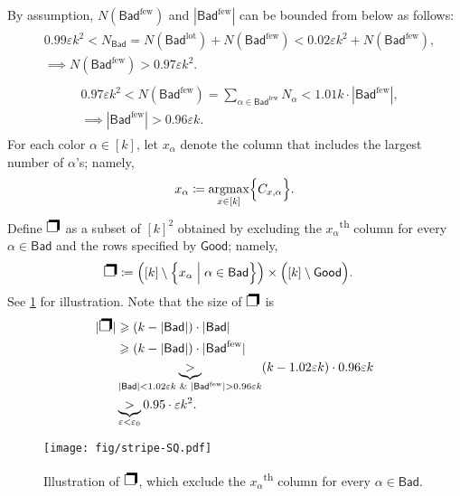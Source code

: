 \documentclass[11pt,fleqn]{article}
\renewcommand{\geq}{\geqslant}
\renewcommand{\epsilon}{\varepsilon}
\newcommand{\nth}[1]{#1\textsuperscript{th}\xspace}
\newcommand{\defeq}{\coloneq}
\DeclareMathOperator*{\argmax}{argmax}
\newcommand{\Good}{\mathsf{Good}}
\newcommand{\Bad}{\mathsf{Bad}}
\newcommand{\Badgtr}{\Bad^\mathrm{lot}}
\newcommand{\Badlss}{\Bad^\mathrm{few}}
\newcommand{\SQ}{\text{{\Large\ding{112}}}}
\theoremstyle{definition}
\numberwithin{equation}{section}
\begin{document}
By assumption,
$N(\Badlss)$ and $|\Badlss|$ can be bounded from below as follows:
\begin{align}
\begin{aligned}
    & 0.99\epsilon k^2
    < N_\Bad
    = N(\Badgtr) + N(\Badlss)
    < 0.02 \epsilon k^2 + N(\Badlss), \\
    & \implies N(\Badlss) > 0.97 \epsilon k^2.
\end{aligned}
\end{align}
\begin{align}
\begin{aligned}
    & 0.97 \epsilon k^2
    < N(\Badlss) = \sum_{\alpha \in \Badlss} N_\alpha
    < 1.01k \cdot |\Badlss|, \\
    & \implies |\Badlss| > 0.96 \epsilon k.
\end{aligned}
\end{align}
For each color $\alpha \in [k]$,
let $x_\alpha$ denote the column that includes the largest number of $\alpha$'s; namely,
\begin{align}
    x_\alpha \defeq \argmax_{x \in [k]} \Bigl\{ C_{x,\alpha} \Bigr\}.
\end{align}
Define $\SQ$ as a subset of $[k]^2$ obtained by excluding
the \nth{$x_\alpha$} column for every $\alpha \in \Bad$ and
the rows specified by $\Good$; namely,
\begin{align}
\begin{aligned}
    \SQ & \defeq
        \Bigl( [k] \setminus \Bigl\{x_\alpha \Bigm| \alpha \in \Bad \Bigr\} \Bigr) \times
        \Bigl( [k] \setminus \Good \Bigr).
\end{aligned}
\end{align}
See \cref{fig:Cut-hard:stripe:far:SQ} for illustration.
Note that the size of $\SQ$ is 
\begin{align}
\begin{aligned}
    |\SQ| & \geq (k-|\Bad|) \cdot |\Bad| \\
    & \geq (k-|\Bad|) \cdot |\Badlss| \\
    & \underbrace{>}_{|\Bad| < 1.02\epsilon k \text{ \& } |\Badlss| > 0.96\epsilon k}
        (k-1.02\epsilon k) \cdot 0.96 \epsilon k \\
    & \underbrace{>}_{\epsilon < \epsilon_0} 0.95 \cdot \epsilon k^2.
\end{aligned}
\end{align}


\begin{figure}[t]
    \centering
    \texttt{[image: fig/stripe-SQ.pdf]}
    \caption{
        Illustration of $\SQ$, which exclude the \nth{$x_\alpha$} column for every $\alpha \in \Bad$.
    }
    \label{fig:Cut-hard:stripe:far:SQ}
\end{figure}
\end{document}
